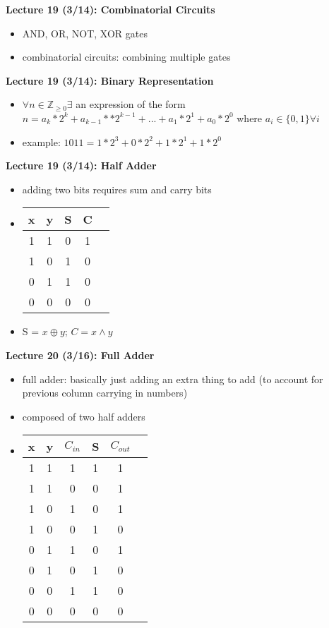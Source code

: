 \documentclass[twocolumn]{article}
\begin{document}
\textbf{Lecture 19 (3/14): Combinatorial Circuits}
\begin{itemize}
    \item AND, OR, NOT, XOR gates
    \item combinatorial circuits: combining multiple gates
\end{itemize}

\textbf{Lecture 19 (3/14): Binary Representation}
\begin{itemize}
    \item $\forall n \in \mathbb{Z}_{\geq 0}\exists$ an expression of the form $n=a_k*2^k+a_{k-1}**2^{k-1}+...+a_1*2^1+a_0*2^0$ where $a_i \in \{0, 1\}\forall i$
    \item example: $1011 = 1*2^3+0*2^2+1*2^1+1*2^0$
\end{itemize}

\textbf{Lecture 19 (3/14): Half Adder}
\begin{itemize}
    \item adding two bits requires sum and carry bits
    \item 
        \begin{tabular}{ |c|c|c|c|c| }
            \hline
            x & y & S & C \\
            \hline
            1 & 1 & 0 & 1\\ 
            1 & 0 & 1 & 0\\ 
            0 & 1 & 1 & 0\\ 
            0 & 0 & 0 & 0\\ 
            \hline
        \end{tabular}
    \item S = $x \oplus y$; $C = x\wedge y$
\end{itemize}

\textbf{Lecture 20 (3/16): Full Adder}
\begin{itemize}
    \item full adder: basically just adding an extra thing to add (to account for previous column carrying in numbers)
    \item composed of two half adders
    \item
        \begin{tabular}{ |c|c|c|c|c|c| }
            \hline
            x & y & $C_{in}$ & S & $C_{out}$ \\
            \hline
            1 & 1 & 1 & 1 & 1\\ 
            1 & 1 & 0 & 0 & 1\\ 
            1 & 0 & 1 & 0 & 1\\ 
            1 & 0 & 0 & 1 & 0\\ 
            0 & 1 & 1 & 0 & 1\\ 
            0 & 1 & 0 & 1 & 0\\ 
            0 & 0 & 1 & 1 & 0\\ 
            0 & 0 & 0 & 0 & 0\\ 
            \hline
        \end{tabular}
\end{itemize}
\end{document}
